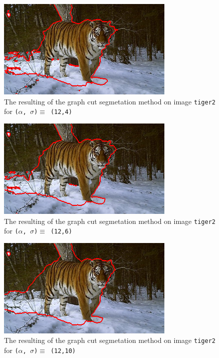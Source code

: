 {  \begin{minipage}{0.45\linewidth}
    \begin{figure}[H]
      \includegraphics[scale=0.5]{./images/04/Q11/var_a_b/tiger2/graphcut2_a12_s4.png}
      \caption{The resulting of the graph cut segmetation method on image \texttt{tiger2} for
        \texttt{($\alpha$, $\sigma$)$ \equiv$ (12,4)}}
      \label{fig:04_tiger22_a12_s4}
    \end{figure}
    \vfill
    \begin{figure}[H]
      \includegraphics[scale=0.5]{./images/04/Q11/var_a_b/tiger2/graphcut2_a12_s6.png}
      \caption{The resulting of the graph cut segmetation method on image \texttt{tiger2} for
        \texttt{($\alpha$, $\sigma$)$ \equiv$ (12,6)}}
      \label{fig:04_tiger22_a12_s6}
    \end{figure}
    \vfill
    \begin{figure}[H]
      \includegraphics[scale=0.5]{./images/04/Q11/var_a_b/tiger2/graphcut2_a12_s10.png}
      \caption{The resulting of the graph cut segmetation method on image \texttt{tiger2} for
        \texttt{($\alpha$, $\sigma$)$ \equiv$ (12,10)}}
      \label{fig:04_tiger22_a12_s10}
    \end{figure}
  \end{minipage}
}


